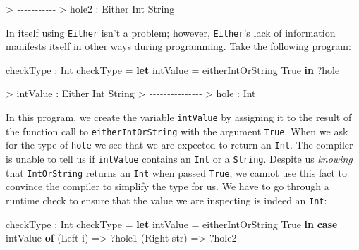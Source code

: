 \documentclass[
]{article}
\newenvironment{Shaded}{}{}
\newcommand{\CommentTok}[1]{\textcolor[rgb]{0.38,0.63,0.69}{\textit{#1}}}
\newcommand{\DataTypeTok}[1]{\textcolor[rgb]{0.56,0.13,0.00}{#1}}
\newcommand{\KeywordTok}[1]{\textcolor[rgb]{0.00,0.44,0.13}{\textbf{#1}}}
\newcommand{\NormalTok}[1]{#1}
\newcommand{\OperatorTok}[1]{\textcolor[rgb]{0.40,0.40,0.40}{#1}}
\newcommand{\OtherTok}[1]{\textcolor[rgb]{0.00,0.44,0.13}{#1}}
\begin{document}
\begin{Shaded}
\begin{Highlighting}[]
\OperatorTok{\textgreater{}} \CommentTok{{-}{-}{-}{-}{-}{-}{-}{-}{-}{-}{-}}
\OperatorTok{\textgreater{}}\NormalTok{ hole2 }\OperatorTok{:} \DataTypeTok{Either} \DataTypeTok{Int} \DataTypeTok{String}
\end{Highlighting}
\end{Shaded}

In itself using \texttt{Either} isn't a problem; however,
\texttt{Either}'s lack of information manifests itself in other ways
during programming. Take the following program:

\begin{Shaded}
\begin{Highlighting}[]
\NormalTok{checkType }\OperatorTok{:} \DataTypeTok{Int}
\NormalTok{checkType }\OtherTok{=} \KeywordTok{let}\NormalTok{ intValue }\OtherTok{=}\NormalTok{ eitherIntOrString }\DataTypeTok{True} 
             \KeywordTok{in} \OperatorTok{?}\NormalTok{hole}
\end{Highlighting}
\end{Shaded}

\begin{Shaded}
\begin{Highlighting}[]
\OperatorTok{\textgreater{}}\NormalTok{ intValue }\OperatorTok{:} \DataTypeTok{Either} \DataTypeTok{Int} \DataTypeTok{String}
\OperatorTok{\textgreater{}} \CommentTok{{-}{-}{-}{-}{-}{-}{-}{-}{-}{-}{-}{-}{-}{-}{-}}
\OperatorTok{\textgreater{}}\NormalTok{ hole }\OperatorTok{:} \DataTypeTok{Int}
\end{Highlighting}
\end{Shaded}

In this program, we create the variable \texttt{intValue} by assigning
it to the result of the function call to \texttt{eitherIntOrString} with
the argument \texttt{True}. When we ask for the type of \texttt{hole} we
see that we are expected to return an \texttt{Int}. The compiler is
unable to tell us if \texttt{intValue} contains an \texttt{Int} or a
\texttt{String}. Despite us \emph{knowing} that \texttt{IntOrString}
returns an \texttt{Int} when passed \texttt{True}, we cannot use this
fact to convince the compiler to simplify the type for us. We have to go
through a runtime check to ensure that the value we are inspecting is
indeed an \texttt{Int}:

\begin{Shaded}
\begin{Highlighting}[]
\NormalTok{checkType }\OperatorTok{:} \DataTypeTok{Int}
\NormalTok{checkType }\OtherTok{=} \KeywordTok{let}\NormalTok{ intValue }\OtherTok{=}\NormalTok{ eitherIntOrString }\DataTypeTok{True} \KeywordTok{in}
                \KeywordTok{case}\NormalTok{ intValue }\KeywordTok{of}
\NormalTok{                     (}\DataTypeTok{Left}\NormalTok{ i) }\OtherTok{=\textgreater{}} \OperatorTok{?}\NormalTok{hole1}
\NormalTok{                     (}\DataTypeTok{Right}\NormalTok{ str) }\OtherTok{=\textgreater{}} \OperatorTok{?}\NormalTok{hole2}
\end{Highlighting}
\end{Shaded}
\end{document}
